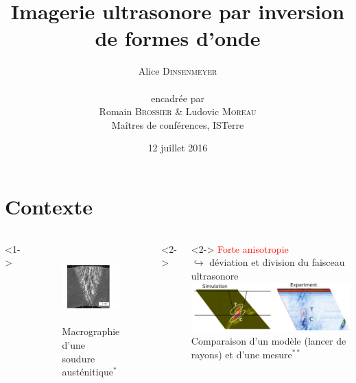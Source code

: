\documentclass[10pt,xcolor=x11names,compress, notes=show]{beamer}%
\author{Alice \textsc{Dinsenmeyer} \\~\\ encadrée par\\ Romain \textsc{Brossier} \& Ludovic \textsc{Moreau} \\ Maîtres de conférences, ISTerre}
\title{Imagerie ultrasonore par inversion de formes d'onde}
\subtitle{}
\date{\small 12 juillet 2016}
\begin{document}
\begin{frame}
	\titlepage 
\end{frame}


\section{Contexte}
\begin{frame}{\insertsectionhead}
\vspace{-0.5cm}
\hspace{1cm}
	\begin{columns}[c]
			<1->
			\centering
			\begin{figure}
				\includegraphics[height=2.7cm]{./img/soudure1.png}\\
				{\centering \tiny Macrographie d'une soudure austénitique$^{*}$}
			\end{figure}
			<2->
			\hspace{-3cm}
			\vspace{2cm}
			<2->
			\hspace{-1cm}
			\textcolor{red}{Forte anisotropie}\\
			$\hookrightarrow$ déviation et division du faisceau ultrasonore\\[0.2cm]
			\hspace{-0.5cm}
			\includegraphics[scale=0.5]{img/gardahaut.png}\\
			{\centering \tiny Comparaison d'un modèle (lancer de rayons) et d'une mesure$^{**}$}
				

\end{columns}
\end{frame}
\end{document}
